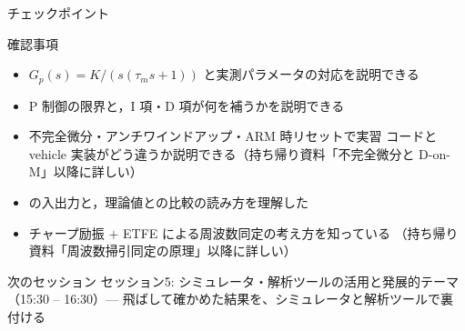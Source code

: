 \begin{frame}{チェックポイント}
  \begin{alertblock}{確認事項}\footnotesize
    \begin{itemize}\setlength{\itemsep}{1pt}
      \item[$\square$] $G_p(s)=K/(s(\tau_m s+1))$ と実測パラメータの対応を説明できる
      \item[$\square$] P 制御の限界と，I 項・D 項が何を補うかを説明できる
      \item[$\square$] 不完全微分・アンチワインドアップ・ARM 時リセットで実習
            コードと vehicle 実装がどう違うか説明できる（持ち帰り資料「不完全微分と
            D-on-M」以降に詳しい）
      \item[$\square$]  の入出力と，理論値との比較の読み方を理解した
      \item[$\square$] チャープ励振 $+$ ETFE による周波数同定の考え方を知っている
            （持ち帰り資料「周波数掃引同定の原理」以降に詳しい）
    \end{itemize}
  \end{alertblock}

  \begin{block}{次のセッション}
    セッション5: シミュレータ・解析ツールの活用と発展的テーマ（15:30 -- 16:30）--- 飛ばして確かめた結果を、シミュレータと解析ツールで裏付ける
  \end{block}
\end{frame}
